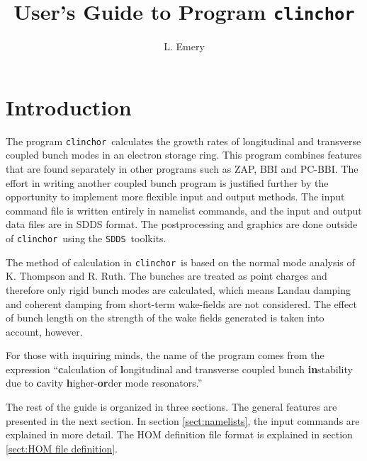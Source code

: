\documentclass[11pt]{article}
\newcommand{\clinchor}{{\tt clinchor}}
\newcommand{\SDDS}{{\tt SDDS}}
\begin{document}
\title{User's Guide to Program \clinchor}
\author{L. Emery}
\maketitle
\section{Introduction}
The program \clinchor\ calculates the growth rates of longitudinal and
transverse coupled bunch modes in an electron storage ring.  This
program combines features that are found separately in other programs
such as ZAP\cite{ZAP}, BBI\cite{BBI} and PC-BBI\cite{PC-BBI}.  The
effort in writing another coupled bunch program is justified further
by the opportunity to implement more flexible input and output
methods. The input command file is written entirely in namelist
commands, and the input and output data files are in
SDDS format.  The postprocessing and graphics are
done outside of \clinchor\ using the \SDDS\ toolkits.

The method of calculation in \clinchor\ is based on the normal mode
analysis of K. Thompson and R. Ruth\cite{Thompson:PAC89}. 
The bunches are treated as point charges and therefore only rigid bunch
modes are calculated, which means Landau damping and coherent damping from
short-term wake-fields are not considered.
The effect of bunch length on the strength of the wake fields generated is
taken into account, however.

For those with inquiring minds, the name of the program comes from the expression
``{\bf c}alculation of {\bf l}ongitudinal and transverse coupled bunch {\bf in}stability
due to {\bf c}avity {\bf h}igher-{\bf or}der mode resonators.''

The rest of the guide is organized in three sections. The general
features are presented in the next section.  In section
\ref{sect:namelists}, the input commands are explained in more detail.
The HOM definition file format is explained in section \ref{sect:HOM
file definition}.
\end{document}
